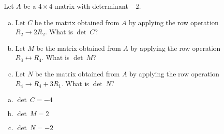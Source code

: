 
\begin{exerciseStatement}


Let \(A\) be a \(4 \times 4\) matrix with determinant \( -2 \).


\begin{enumerate}[(a)]
\item Let \(C\) be the matrix obtained from \(A\) by applying the row operation \( R_2 \to 2R_2 \). What is \(\operatorname{det}\ C\)?
\item Let \(M\) be the matrix obtained from \(A\) by applying the row operation \( R_3 \leftrightarrow R_4 \). What is \(\operatorname{det}\ M\)?
\item Let \(N\) be the matrix obtained from \(A\) by applying the row operation \( R_4 \to R_4 + 3R_1 \). What is \(\operatorname{det}\ N\)?
\end{enumerate}
    
\end{exerciseStatement}
    
\begin{exerciseAnswer} 

\begin{enumerate}[(a)]
\item \(\operatorname{det}\ C= -4 \)
\item \(\operatorname{det}\ M= 2 \)
\item \(\operatorname{det}\ N= -2 \)
\end{enumerate}
    
\end{exerciseAnswer}
    

